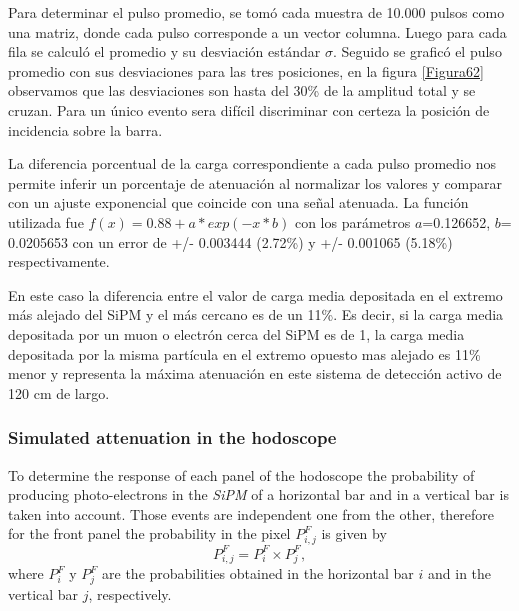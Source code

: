 \documentclass[submitting]{nst}
\begin{document}
Para determinar el pulso promedio, se tomó cada muestra de 10.000 pulsos como una matriz, donde cada pulso corresponde a un vector columna. Luego para cada fila se calculó el promedio y su desviación estándar $\sigma$. Seguido se graficó el pulso promedio con sus desviaciones para las tres posiciones, en la figura \ref{Figura62} observamos que las desviaciones son hasta del 30\% de la amplitud total y se cruzan. Para un único evento sera difícil discriminar con certeza la posición de incidencia sobre la barra.

La diferencia porcentual de la carga correspondiente a cada pulso promedio nos permite inferir un porcentaje de atenuación al normalizar los valores y comparar con un ajuste exponencial que coincide con una señal atenuada. La función utilizada fue $f(x)=0.88+a*exp(-x*b)$ con los parámetros $a$=0.126652, $b$= 0.0205653 con un error de +/- 0.003444 (2.72\%) y +/- 0.001065 (5.18\%) respectivamente.

En este caso la diferencia entre el valor de carga media depositada en el extremo más alejado del SiPM y el más cercano es de un 11\%. Es decir, si la carga media depositada por un muon o electrón cerca del SiPM es de 1, la carga media depositada por la misma partícula en el extremo opuesto mas alejado es 11\% menor y representa la máxima atenuación en este sistema de detección activo de 120 cm de largo.












\subsubsection{Simulated attenuation in the hodoscope}
\label{sec:hodoscope-response-two} %
To determine the response of each panel of the hodoscope the probability of producing photo-electrons in the \textsl{SiPM} of a horizontal bar and in a vertical bar is taken into account. Those events are independent one from the other, therefore for the front panel the probability in the pixel $P^{F}_{i,j}$ is given by 
\begin{equation}
\label{pe_panel}
P^{F}_{i,j}=P^{F}_{i} \times P^{F}_{j},
\end{equation}
where $P^{F}_{i}$ y $P^{F}_j$ are the probabilities obtained in the horizontal bar $i$ and in the vertical bar $j$, respectively.
\end{document}

